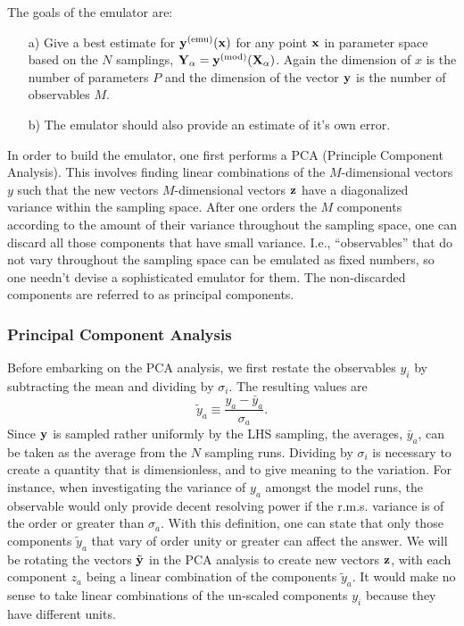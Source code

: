 The goals of the emulator are:
\begin{itemize}
\item[a)] Give a best estimate for ${\bf y}^{(\rm emu)}({\bf x})$ for any point ${\bf x}$ in parameter space based on the $N$ samplings, ${\bf Y}_\alpha={\bf y}^{\rm(mod)}({\bf X}_\alpha)$. Again the dimension of $x$ is the number of parameters $P$ and the dimension of the vector ${\bf y}$ is the number of observables $M$.
\item[b)] The emulator should also provide an estimate of it's own error.
\end{itemize}

In order to build the emulator, one first performs a PCA (Principle Component Analysis). This involves finding linear combinations of the $M$-dimensional vectors $y$ such that the new vectors $M$-dimensional vectors ${\bf z}$ have a diagonalized variance within the sampling space. After one orders the $M$ components according to the amount of their variance throughout the sampling space, one can discard all those components that have small variance. I.e., ``observables'' that do not vary throughout the sampling space can be emulated as fixed numbers, so one needn't devise a sophisticated emulator for them. The non-discarded components are referred to as principal components.

\subsubsection{Principal Component Analysis}

Before embarking on the PCA analysis, we first restate the observables $y_i$ by subtracting the mean and dividing by $\sigma_i$. The resulting values are
\begin{equation}
\tilde{y}_a\equiv\frac{y_a-\bar{y}_a}{\sigma_a}.
\end{equation}
Since ${\bf y}$ is sampled rather uniformly by the LHS sampling, the averages, $\bar{y}_a$, can be taken as the average from the $N$ sampling runs. Dividing by $\sigma_i$ is necessary to create a quantity that is dimensionless, and to give meaning to the variation. For instance, when investigating the variance of $y_a$ amongst the model runs, the observable would only provide decent resolving power if the r.m.s. variance is of the order or greater than $\sigma_a$. With this definition, one can state that only those components $\tilde{y}_a$ that vary of order unity or greater can affect the answer. We will be rotating the vectors $\tilde{\bf y}$ in the PCA analysis to create new vectors ${\bf z}$, with each component $z_a$ being a linear combination of the components $\tilde{y}_a$. It would make no sense to take linear combinations of the un-scaled components $y_i$ because they have different units.

